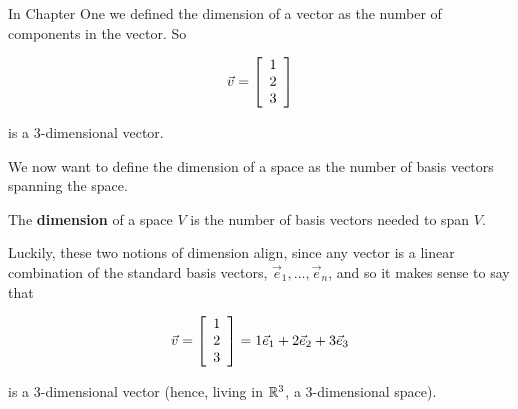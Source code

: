 \documentclass{ximera}
\begin{document}
\begin{exploration}

    






\begin{remark}

  In Chapter One we defined the dimension of a vector as the number of components in the vector. So 

  $$\vec{v}=\startmat{r} 1 \\ 2 \\ 3 \stopmat$$

  is a 3-dimensional vector.

  We now want to define the dimension of a space as the number of basis vectors spanning the space.

  \begin{definition}
  
    The \textbf{dimension} of a space $V$ is the number of basis vectors needed to span $V$.

  \end{definition}

  Luckily, these two notions of dimension align, since any vector is a linear combination of the standard basis vectors, $\vec{e}_1,\ldots,\vec{e}_n$, and so it makes sense to say that 

  $$\vec{v}=\startmat{r} 1 \\ 2 \\ 3 \stopmat=1\vec{e}_1+2\vec{e}_2+3\vec{e}_3$$

  is a 3-dimensional vector (hence, living in $\R^3$, a 3-dimensional space).


\end{remark}
\end{exploration}
\end{document}

